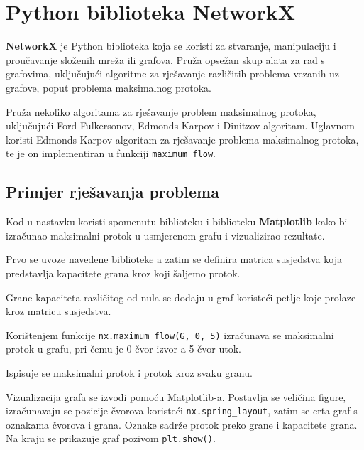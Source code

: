 \documentclass[11pt, a4paper]{article}
\begin{document}
	\newpage
	\section{Python biblioteka NetworkX}
	
	\textbf{NetworkX} je Python biblioteka koja se koristi za stvaranje, manipulaciju i proučavanje složenih mreža ili grafova. Pruža opsežan skup alata za rad s grafovima, uključujući algoritme za rješavanje različitih problema vezanih uz grafove, poput problema maksimalnog protoka.
	
	Pruža nekoliko algoritama za rješavanje problem maksimalnog protoka, uključujući Ford-Fulkersonov, Edmonds-Karpov i Dinitzov algoritam. Uglavnom koristi Edmonds-Karpov algoritam za rješavanje problema maksimalnog protoka, te je on implementiran u funkciji \texttt{maximum\_flow}.
	
	\subsection{Primjer rješavanja problema}
	
	Kod u nastavku koristi spomenutu biblioteku i biblioteku \textbf{Matplotlib} kako bi izračunao maksimalni protok u usmjerenom grafu i vizualizirao rezultate.
	
	Prvo se uvoze navedene biblioteke a	zatim se definira matrica susjedstva koja predstavlja kapacitete grana kroz koji šaljemo protok.
	
	Grane kapaciteta različitog od nula se dodaju u graf koristeći petlje koje prolaze kroz matricu susjedstva.
	
	Korištenjem funkcije \texttt{nx.maximum\_flow(G, 0, 5)} izračunava se maksimalni protok u grafu, pri čemu je 0 čvor izvor a 5 čvor utok.
	
	Ispisuje se maksimalni protok i protok kroz svaku granu.
	
	Vizualizacija grafa se izvodi pomoću Matplotlib-a. Postavlja se veličina figure, izračunavaju se pozicije čvorova koristeći \texttt{nx.spring\_layout}, zatim se crta graf s oznakama čvorova i grana. Oznake sadrže protok preko grane i kapacitete grana. Na kraju se prikazuje graf pozivom \texttt{plt.show()}.
	
\end{document}
